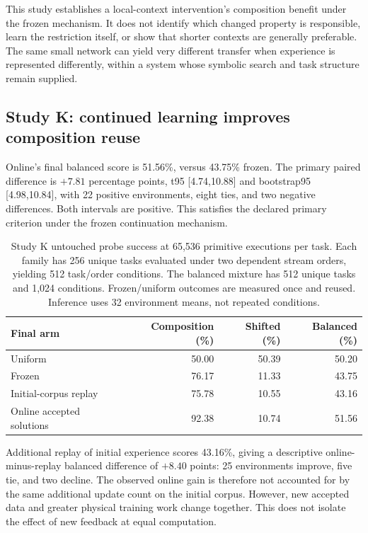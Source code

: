 \documentclass[11pt]{article}
\begin{document}
This study establishes a local-context intervention's composition benefit
under the frozen mechanism. It does not identify which changed property is
responsible, learn the restriction itself, or show that shorter contexts are
generally preferable. The same small network can yield very different
transfer when experience is represented differently, within a system whose
symbolic search and task structure remain supplied.

\subsection{Study K: continued learning improves composition reuse}
Online's final balanced score is 51.56\%, versus 43.75\% frozen. The primary
paired difference is $+7.81$ percentage points, t95 [4.74,10.88] and
bootstrap95 [4.98,10.84], with 22 positive environments, eight ties, and two
negative differences. Both intervals are positive. This satisfies the
declared primary criterion under the frozen continuation mechanism.

\begin{table}[ht]
\centering\small
\begin{tabular}{lrrr}
\toprule
Final arm & Composition (\%) & Shifted (\%) & Balanced (\%) \\
\midrule
Uniform & 50.00 & 50.39 & 50.20 \\
Frozen & 76.17 & 11.33 & 43.75 \\
Initial-corpus replay & 75.78 & 10.55 & 43.16 \\
Online accepted solutions & 92.38 & 10.74 & 51.56 \\
\bottomrule
\end{tabular}
\caption{Study K untouched probe success at 65,536 primitive executions per
 task. Each family has 256 unique tasks evaluated under two dependent stream
 orders, yielding 512 task/order conditions. The balanced mixture has 512
 unique tasks and 1,024 conditions. Frozen/uniform outcomes are measured once
 and reused. Inference uses 32 environment means, not repeated conditions.}
\label{tab:k-results}
\end{table}

Additional replay of initial experience scores 43.16\%, giving a descriptive
online-minus-replay balanced difference of $+8.40$ points: 25 environments
improve, five tie, and two decline. The observed online gain is therefore not
accounted for by the same additional update count on the initial corpus.
However, new accepted data and greater physical training work change together.
This does not isolate the effect of new feedback at equal computation.
\end{document}

